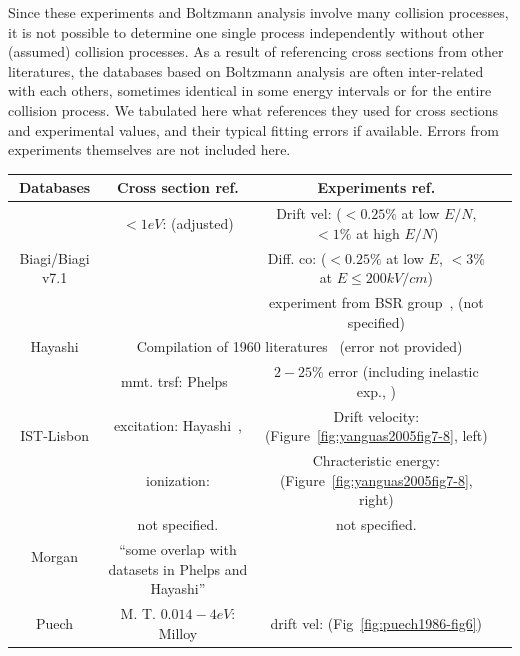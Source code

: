 \documentclass[11pt]{article}
\begin{document}
Since these experiments and Boltzmann analysis involve many collision processes,
it is not possible to determine one single process independently without other (assumed) collision processes.
As a result of referencing cross sections from other literatures,
the databases based on Boltzmann analysis are often inter-related with each others,
sometimes identical in some energy intervals or for the entire collision process.
We tabulated here what references they used for cross sections and experimental values,
and their typical fitting errors if available.
Errors from experiments themselves are not included here.
\par
\hspace{-3cm}
\begin{tabular}{|c|c|c|c|}
\hline
Databases & Cross section ref. & Experiments ref.\\
\hline
\multirow{3}{*}{Biagi/Biagi v7.1} & $<1eV$: \cite{Haddad1982} (adjusted) & Drift vel: \cite{Nakamura1988} ($<0.25\%$ at low $E/N$, $<1\%$ at high $E/N$)\\
& & Diff. co: \cite{Milloy1977,Milloy1977ratio,Saelee1976,Kucukarpaci1981,Levine1964} ($<0.25\%$ at low $E$, $<3\%$ at $E\le200kV/cm$)\\
& & experiment from BSR group~\cite{Allan2006}, \cite{Oliveira2011,Sahin2010} (not specified)\\
\hline
Hayashi & \multicolumn{2}{|c|}{Compilation of 1960 literatures~\cite{Hayashi2003} (error not provided)} \\
\hline
\multirow{3}{*}{IST-Lisbon} & mmt. trsf: Phelps~\cite{Yamabe1983} & $2-25\%$ error (including inelastic exp., \cite{Alves2014})\\
& excitation: Hayashi~\cite{Hayashi2003}, \cite{Khakoo2003,Chilton1998,Weber2003,Drawin1967,Lee1973,Bretagne1986,Bretagne1982}
& Drift velocity: \cite{Nielsen1936,Bowe1960,Pack1961,Wagner1967,Robertson1977,Christophorou1979,Kucukarpaci1981,Nakamura1988} (Figure~\ref{fig:yanguas2005fig7-8}, left)\\
& ionization: \cite{Rapp1965} & Chracteristic energy: \cite{Townsend1922,Townsend1923,Warren1962} (Figure~\ref{fig:yanguas2005fig7-8}, right) \\
\hline
\multirow{2}{*}{Morgan} & not specified. & not specified. \\
& {\tiny \enquote{some overlap with datasets in Phelps and Hayashi} }\cite{Pitchford2017} & \\
\hline
\multirow{3}{*}{Puech} & M. T. $0.014-4eV$: Milloy\cite{Milloy1977} & drift vel: \cite{Robertson1977,Kucukarpaci1981} (Fig~\ref{fig:puech1986-fig6}) \\

\end{tabular}
\end{document}
